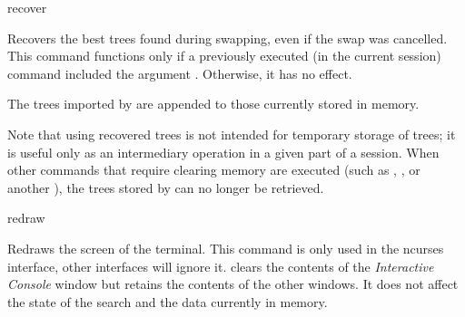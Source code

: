 \begin{command}{recover}{}
    \syntax{\obligatory{()}}

    \begin{poydescription}
            Recovers the best trees found during swapping, even if the swap was
            cancelled. This command functions only if a previously executed 
            (in the current \poy session) command  included
	the argument . Otherwise, it has no effect.
	
	The trees imported by  are appended to those currently
	stored in memory.
	
	Note that using recovered trees is not intended for temporary storage of trees;
	it is useful only as an intermediary operation in a given part of a \poy session. When
	other commands that require clearing memory are executed (such as
	, , or another
	),
	the trees stored by  can no longer be retrieved.
            
    \end{poydescription}

    \begin{poyexamples}
    \end{poyexamples}

    \begin{poyalso}
    \end{poyalso}
\end{command}

\begin{command}{redraw}{}

	\syntax{\obligatory{()}}

	\begin{poydescription}
        Redraws the screen of the terminal. This command is only used in the ncurses
        interface, other interfaces will ignore it.  clears the
        contents of the \emph{Interactive Console} window but retains the contents
        of the other windows. It does not affect the state of the search and the data
        currently in memory.
	\end{poydescription}

    \begin{poyexamples}
    \end{poyexamples}

\end{command}

